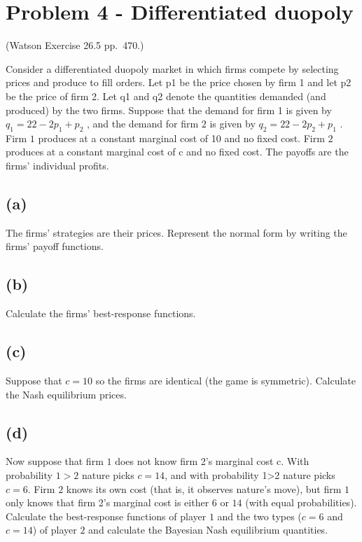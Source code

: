 \documentclass{article}
\begin{document}
\section{Problem 4 - Differentiated duopoly}

(Watson Exercise 26.5 pp.~470.)

Consider a differentiated duopoly market in which firms compete by selecting
prices and produce to fill orders. Let p1 be the price chosen by firm
1 and let p2 be the price of firm 2. Let q1 and q2 denote the quantities demanded
(and produced) by the two firms. Suppose that the demand for firm
1 is given by $q_1 = 22 − 2p_1 + p_2$ , and the demand for firm $2$ is given by
$q_2 = 22 − 2p_2 + p_1$ . Firm $1$ produces at a constant marginal cost of 10 and
no fixed cost. Firm $2$ produces at a constant marginal cost of c and no fixed
cost. The payoffs are the firms' individual profits.

\subsection*{(a)} The firms' strategies are their prices. Represent the normal form by
writing the firms' payoff functions.
\subsection*{(b)} Calculate the firms' best-response functions.
\subsection*{(c)} Suppose that $c = 10$ so the firms are identical (the game is symmetric).
Calculate the Nash equilibrium prices.
\subsection*{(d)} Now suppose that firm $1$ does not know firm 2's marginal cost c. With
probability $1>2$ nature picks $c = 14$, and with probability 1>2 nature
picks $c = 6$. Firm $2$ knows its own cost (that is, it observes nature's
move), but firm $1$ only knows that firm 2's marginal cost is either 6 or
$14$ (with equal probabilities). Calculate the best-response functions of
player $1$ and the two types ($c = 6$ and $c = 14$) of player $2$ and calculate
the Bayesian Nash equilibrium quantities.
\end{document}
